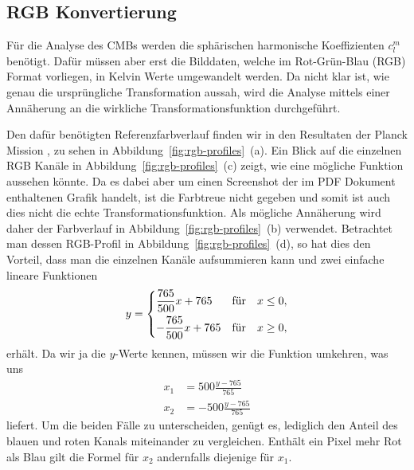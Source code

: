 \subsection{RGB Konvertierung}

Für die Analyse des CMBs werden die sphärischen harmonische Koeffizienten 
$c_l^m$ benötigt. Dafür müssen aber erst die Bilddaten, welche im Rot-Grün-Blau 
(RGB) Format vorliegen, in Kelvin Werte umgewandelt werden. Da nicht klar ist, 
%
wie genau die ursprüngliche Transformation aussah, wird die Analyse mittels 
einer Annäherung an die wirkliche Transformationsfunktion durchgeführt.

Den dafür benötigten Referenzfarbverlauf finden wir in den Resultaten der 
Planck Mission \cite{cmb:planck_overview}, zu sehen in 
Abbildung~\ref{fig:rgb-profiles}~(a). Ein Blick auf die einzelnen RGB 
Kanäle in Abbildung~\ref{fig:rgb-profiles}~(c) zeigt, wie eine mögliche 
Funktion aussehen könnte. Da es dabei aber um einen Screenshot 
der im PDF Dokument enthaltenen Grafik handelt, ist die Farbtreue nicht gegeben 
und somit ist auch dies nicht die echte Transformationsfunktion. Als mögliche 
Annäherung wird daher der Farbverlauf in Abbildung~\ref{fig:rgb-profiles}~(b) 
verwendet. Betrachtet man dessen RGB-Profil in 
Abbildung~\ref{fig:rgb-profiles}~(d), so hat dies den Vorteil, dass man die 
einzelnen Kanäle aufsummieren kann und zwei einfache lineare Funktionen
\begin{equation*}
	y =
	\begin{dcases}
		\frac{765}{500}x + 765 & \text{für} \quad x \leq 0,\\
		-\frac{765}{500}x + 765 & \text{für} \quad x \geq 0,\\
	\end{dcases}
\end{equation*}
erhält. Da wir ja die $y$-Werte kennen, müssen wir die Funktion umkehren, 
was uns
\begin{align*}
	x_1 &= 500\frac{y - 765}{765}\\
	x_2 &= -500\frac{y - 765}{765}
\end{align*}
liefert. Um die beiden Fälle zu unterscheiden, genügt es, lediglich den Anteil 
des blauen und roten Kanals miteinander zu vergleichen. Enthält ein Pixel mehr 
Rot als Blau gilt die Formel für $x_2$ andernfalls diejenige für $x_1$.

